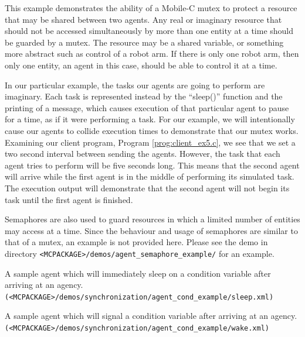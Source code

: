 \documentclass[11pt]{report}
\begin{document}
This example demonstrates the ability of a Mobile-C mutex to protect
a resource that may be shared between two agents. Any real or
imaginary resource that should
not be accessed simultaneously by more than one entity at a time should
be guarded by a mutex. The resource may be a shared variable, or something
more abstract such as control of a robot arm. If there is only one robot arm,
then only one entity, an agent in this case, should be able to control it at a 
time.

In our particular example, the tasks our agents are going to perform are
imaginary. Each task is represented instead by the ``sleep()'' function and
the printing of a message,
which causes execution of that particular agent to pause for a time, as
if it were performing a task. For our example, we will intentionally
cause our agents to collide execution times to demonstrate that our 
mutex works. Examining our client program, Program 
\vref{prog:client_ex5.c},
we see that we set a two second interval between sending the agents. However,
the task that each agent tries to perform will be five seconds long. This
means that the second agent will arrive while the first agent is in the middle
of performing its simulated task. The execution output will demonstrate that
the second agent will not begin its task until the first agent is finished.

Semaphores are also used to guard resources in which a limited number of
entities may access at a time. Since the behaviour and usage of semaphores are
similar to that of a mutex, an example is not provided here. Please see
the demo in directory \texttt{<MCPACKAGE>/demos/agent\_semaphore\_example/} for an example.

\begin{Program}[!t]
\begin{center}
   {\footnotesize \linespread{1.0} }
\end{center}
\caption{A sample agent which will immediately sleep on a condition variable
after arriving at an agency. \texttt{(<MCPACKAGE>/demos/synchronization/agent\_cond\_example/sleep.xml)}}
\label{prog:cond_agent_1}
\end{Program}

\begin{Program}[!t]
\begin{center}
   {\footnotesize \linespread{1.0} }
\end{center}
\caption{A sample agent which will signal a condition variable after arriving
at an agency. \texttt{(<MCPACKAGE>/demos/synchronization/agent\_cond\_example/wake.xml)}}
\label{prog:cond_agent_2}
\end{Program}
\end{document}
